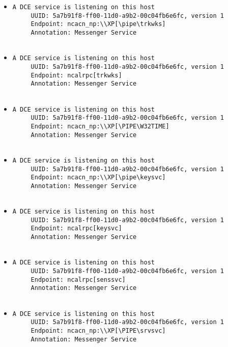 \documentclass{article}
\begin{document}
\begin{itemize}
\begin{verbatim}
\end{verbatim}\item \begin{verbatim}
A DCE service is listening on this host
     UUID: 5a7b91f8-ff00-11d0-a9b2-00c04fb6e6fc, version 1
     Endpoint: ncacn_np:\\XP[\pipe\trkwks]
     Annotation: Messenger Service


\end{verbatim}\item \begin{verbatim}
A DCE service is listening on this host
     UUID: 5a7b91f8-ff00-11d0-a9b2-00c04fb6e6fc, version 1
     Endpoint: ncalrpc[trkwks]
     Annotation: Messenger Service


\end{verbatim}\item \begin{verbatim}
A DCE service is listening on this host
     UUID: 5a7b91f8-ff00-11d0-a9b2-00c04fb6e6fc, version 1
     Endpoint: ncacn_np:\\XP[\PIPE\W32TIME]
     Annotation: Messenger Service


\end{verbatim}\item \begin{verbatim}
A DCE service is listening on this host
     UUID: 5a7b91f8-ff00-11d0-a9b2-00c04fb6e6fc, version 1
     Endpoint: ncacn_np:\\XP[\pipe\keysvc]
     Annotation: Messenger Service


\end{verbatim}\item \begin{verbatim}
A DCE service is listening on this host
     UUID: 5a7b91f8-ff00-11d0-a9b2-00c04fb6e6fc, version 1
     Endpoint: ncalrpc[keysvc]
     Annotation: Messenger Service


\end{verbatim}\item \begin{verbatim}
A DCE service is listening on this host
     UUID: 5a7b91f8-ff00-11d0-a9b2-00c04fb6e6fc, version 1
     Endpoint: ncalrpc[senssvc]
     Annotation: Messenger Service


\end{verbatim}\item \begin{verbatim}
A DCE service is listening on this host
     UUID: 5a7b91f8-ff00-11d0-a9b2-00c04fb6e6fc, version 1
     Endpoint: ncacn_np:\\XP[\PIPE\srvsvc]
     Annotation: Messenger Service



\end{verbatim}
\end{itemize}
\end{document}
